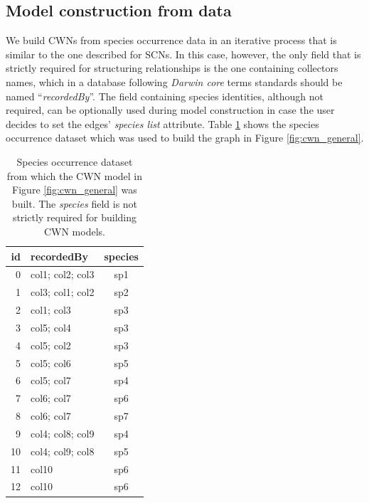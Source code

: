 {%
\subsection{Model construction from data} \label{section:cwn_construction_fromdata}

We build CWNs from species occurrence data in an iterative process that is similar to the one described for SCNs.
In this case, however, the only field that is strictly required for structuring relationships is the one containing collectors names, which in a database following \textit{Darwin core} terms standards should be named ``\textit{recordedBy}''.
The field containing species identities, although not required, can be optionally used during model construction in case the user decides to set the edges' \textit{species list} attribute.
Table \ref{table:cwn_example_dataset} shows the species occurrence dataset which was used to build the graph in Figure \ref{fig:cwn_general}.

\begin{table}[!ht]
  \caption{Species occurrence dataset from which the CWN model in Figure \ref{fig:cwn_general} was built. The \textit{species} field is not strictly required for building CWN models.}
  \begin{center}
  \begin{tabular}{r l c}
      id & recordedBy & species \\
      \hline
        0 & col1; col2; col3 & sp1\\ 
        1 & col3; col1; col2 & sp2\\ 
        2 & col1; col3 & sp3\\ 
        3 & col5; col4 & sp3\\ 
        4 & col5; col2 & sp3\\ 
        5 & col5; col6 & sp5\\ 
        6 & col5; col7 & sp4\\ 
        7 & col6; col7 & sp6\\ 
        8 & col6; col7 & sp7\\ 
        9 & col4; col8; col9 & sp4\\ 
        10 & col4; col9; col8 & sp5\\ 
        11 & col10 & sp6\\ 
        12 & col10 & sp6\\
       \hline
  \end{tabular}
  \end{center}
  \label{table:cwn_example_dataset}
\end{table}

}
